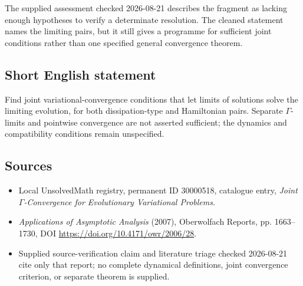 \documentclass[11pt]{article}
\begin{document}
The supplied assessment checked 2026-08-21 describes the fragment as lacking enough hypotheses to verify a determinate resolution. The cleaned statement names the limiting pairs, but it still gives a programme for sufficient joint conditions rather than one specified general convergence theorem.
\subsection{Short English statement}
Find joint variational-convergence conditions that let limits of solutions solve the limiting evolution, for both dissipation-type and Hamiltonian pairs. Separate \(\Gamma\)-limits and pointwise convergence are not asserted sufficient; the dynamics and compatibility conditions remain unspecified.
\subsection{Sources}
\begin{itemize}
\item Local UnsolvedMath registry, permanent ID 30000518, catalogue entry, \emph{Joint \(\Gamma\)-Convergence for Evolutionary Variational Problems}.
\item \emph{Applications of Asymptotic Analysis} (2007), Oberwolfach Reports, pp. 1663--1730, DOI \url{https://doi.org/10.4171/owr/2006/28}.
\item Supplied source-verification claim and literature triage checked 2026-08-21 cite only that report; no complete dynamical definitions, joint convergence criterion, or separate theorem is supplied.
\end{itemize}
\end{document}
